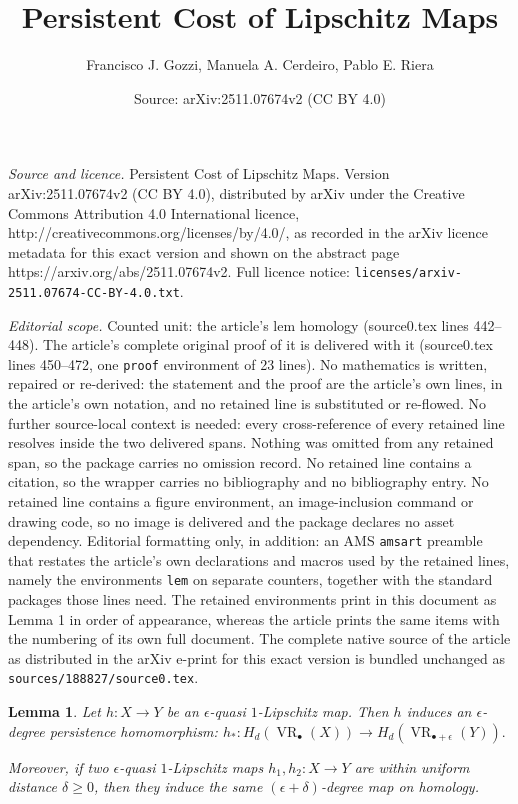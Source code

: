 \documentclass[10pt,a4paper]{amsart}
\title{Persistent Cost of Lipschitz Maps}
\author{Francisco J. Gozzi, Manuela A. Cerdeiro, Pablo E. Riera}
\date{Source: arXiv:2511.07674v2 (CC BY 4.0)}
\newtheorem{lem}{Lemma}
\newcommand{\bu}{_{\bullet}}
\begin{document}
\maketitle

\noindent\emph{Source and licence.} Persistent Cost of Lipschitz Maps. Version arXiv:2511.07674v2 (CC BY 4.0), distributed by arXiv under the Creative Commons Attribution 4.0 International licence, http://creativecommons.org/licenses/by/4.0/, as recorded in the arXiv licence metadata for this exact version and shown on the abstract page https://arxiv.org/abs/2511.07674v2. Full licence notice: \texttt{licenses/arxiv-2511.07674-CC-BY-4.0.txt}.\par\smallskip

\noindent\textit{Editorial scope.} Counted unit: the article's lem homology (source0.tex lines 442--448). The article's complete original proof of it is delivered with it (source0.tex lines 450--472, one \texttt{proof} environment of 23 lines). No mathematics is written, repaired or re-derived: the statement and the proof are the article's own lines, in the article's own notation, and no retained line is substituted or re-flowed.  No further source-local context is needed: every cross-reference of every retained line resolves inside the two delivered spans.  Nothing was omitted from any retained span, so the package carries no omission record.  No retained line contains a citation, so the wrapper carries no bibliography and no bibliography entry.  No retained line contains a figure environment, an image-inclusion command or drawing code, so no image is delivered and the package declares no asset dependency.  Editorial formatting only, in addition: an AMS \texttt{amsart} preamble that restates the article's own declarations and macros used by the retained lines, namely the environments \texttt{lem} on separate counters, together with the standard packages those lines need.  The retained environments print in this document as Lemma 1 in order of appearance, whereas the article prints the same items with the numbering of its own full document.  The complete native source of the article as distributed in the arXiv e-print for this exact version is bundled unchanged as \texttt{sources/188827/source0.tex}.
\begin{lem}\label{lemma induced function on homology}
Let \( h : X \to Y \) be an \( \epsilon \)-quasi \( 1 \)-Lipschitz map. Then \( h \) induces an \( \epsilon \)-degree persistence homomorphism: $
h_* : H_d(\operatorname{VR}\bu(X)) \to H_d(\operatorname{VR}_{\bullet+\epsilon}(Y)).$


Moreover, if two \( \epsilon \)-quasi \( 1 \)-Lipschitz maps \( h_1, h_2 : X \to Y \) are within uniform distance \( \delta \geq 0 \), then they induce the same \( (\epsilon + \delta) \)-degree map on homology.
\end{lem}
\end{document}
